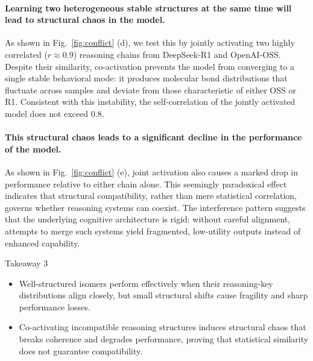 \paragraph{\textbf{Learning two heterogeneous stable structures at the same time will lead to structural chaos in the model.}}
As shown in Fig.~\ref{fig:conflict} (d), we test this by jointly activating two highly correlated (\(r \approx 0.9\)) reasoning chains from DeepSeek-R1 and OpenAI-OSS. Despite their similarity, co-activation prevents the model from converging to a single stable behavioral mode: it produces molecular bond distributions that fluctuate across samples and deviate from those characteristic of either OSS or R1. Consistent with this instability, the self-correlation of the jointly activated model does not exceed 0.8.\vspace{-8pt}

\paragraph{\textbf{This structural chaos leads to a significant decline in the performance of the model.}}
As shown in Fig.~\ref{fig:conflict} (e), joint activation also causes a marked drop in performance relative to either chain alone. This seemingly paradoxical effect indicates that structural compatibility, rather than mere statistical correlation, governs whether reasoning systems can coexist. The interference pattern suggests that the underlying cognitive architecture is rigid: without careful alignment, attempts to merge such systems yield fragmented, low-utility outputs instead of enhanced capability.


\begin{TakeawayBox}{Takeaway 3}
\begin{itemize}[leftmargin=16pt, itemsep=0pt, topsep=0pt]
    \item Well-structured isomers perform effectively when their reasoning-key distributions align closely, but small structural shifts cause fragility and sharp performance losses.
    \item Co-activating incompatible reasoning structures induces structural chaos that breaks coherence and degrades performance, proving that statistical similarity does not guarantee compatibility.
\end{itemize} 
\end{TakeawayBox}
